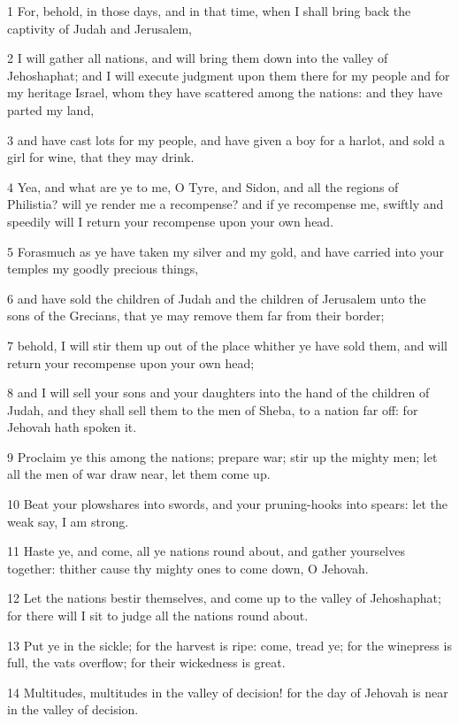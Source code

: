 \par 1 For, behold, in those days, and in that time, when I shall bring back the captivity of Judah and Jerusalem,
\par 2 I will gather all nations, and will bring them down into the valley of Jehoshaphat; and I will execute judgment upon them there for my people and for my heritage Israel, whom they have scattered among the nations: and they have parted my land,
\par 3 and have cast lots for my people, and have given a boy for a harlot, and sold a girl for wine, that they may drink.
\par 4 Yea, and what are ye to me, O Tyre, and Sidon, and all the regions of Philistia? will ye render me a recompense? and if ye recompense me, swiftly and speedily will I return your recompense upon your own head.
\par 5 Forasmuch as ye have taken my silver and my gold, and have carried into your temples my goodly precious things,
\par 6 and have sold the children of Judah and the children of Jerusalem unto the sons of the Grecians, that ye may remove them far from their border;
\par 7 behold, I will stir them up out of the place whither ye have sold them, and will return your recompense upon your own head;
\par 8 and I will sell your sons and your daughters into the hand of the children of Judah, and they shall sell them to the men of Sheba, to a nation far off: for Jehovah hath spoken it.
\par 9 Proclaim ye this among the nations; prepare war; stir up the mighty men; let all the men of war draw near, let them come up.
\par 10 Beat your plowshares into swords, and your pruning-hooks into spears: let the weak say, I am strong.
\par 11 Haste ye, and come, all ye nations round about, and gather yourselves together: thither cause thy mighty ones to come down, O Jehovah.
\par 12 Let the nations bestir themselves, and come up to the valley of Jehoshaphat; for there will I sit to judge all the nations round about.
\par 13 Put ye in the sickle; for the harvest is ripe: come, tread ye; for the winepress is full, the vats overflow; for their wickedness is great.
\par 14 Multitudes, multitudes in the valley of decision! for the day of Jehovah is near in the valley of decision.
